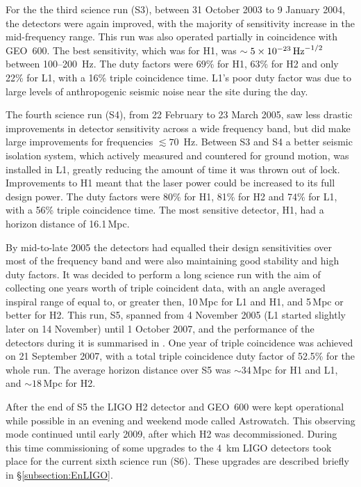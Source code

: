 \documentclass{article}
\begin{document}
For the the third science run (S3), between 31 October 2003 to 9 January 2004,
the detectors were again improved, with the majority of sensitivity increase in
the mid-frequency range. This run was also operated partially in coincidence
with GEO~600. The best sensitivity, which was for H1, was
$\sim5\times10^{-23}\,{\rm Hz}^{-1/2}$ between 100--200~Hz. The duty factors
were 69\% for H1, 63\% for H2 and only 22\% for L1, with a 16\% triple
coincidence time. L1's poor duty factor was due to large levels of anthropogenic
seismic noise near the site during the day.

The fourth science run (S4), from 22 February to 23 March 2005, saw less drastic
improvements in detector sensitivity across a wide frequency band, but did make
large improvements for frequencies $\lesssim 70$~Hz. Between S3 and S4 a better
seismic isolation system, which actively measured and countered for ground
motion, was installed in L1, greatly reducing the amount of time
it was thrown out of lock. Improvements to H1 meant that the laser power
could be increased to its full design power. The duty factors were 80\% for H1,
81\% for H2 and 74\% for L1, with a 56\% triple coincidence time. The most
sensitive detector, H1, had a horizon distance of 16.1\,Mpc.

By mid-to-late 2005 the detectors had equalled their design sensitivities over
most of the frequency band and were also maintaining good stability and high
duty factors. It was decided to perform a long science run with the aim of
collecting one years worth of triple coincident data, with an angle averaged
inspiral range of equal to, or greater then, 10\,Mpc for L1 and H1, and 5\,Mpc
or better for H2. This run, S5, spanned from 4 November 2005 (L1 started
slightly later on 14 November) until 1 October 2007, and the performance of the
detectors during it is summarised in \cite{LIGOS5}. One year of triple
coincidence was achieved on 21 September 2007, with a total triple coincidence
duty factor of 52.5\% for the whole run. The average horizon distance over S5
was $\sim$34\,Mpc for H1 and L1, and $\sim18$\,Mpc for H2.

After the end of S5 the LIGO H2 detector and GEO~600 were kept operational
while possible in an evening and weekend mode called Astrowatch. This
observing mode continued until early 2009, after which H2 was decommissioned.
During this time commissioning of some upgrades to the 4~km LIGO detectors took
place for the current sixth science run (S6). These upgrades are described
briefly in \S\ref{subsection:EnLIGO}.
\end{document}
